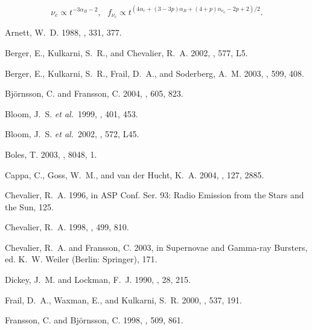 \documentclass[12pt,preprint]{aastex}
\begin{document}
\begin{equation}
\nu_c\propto t^{-3\alpha_B-2},~~~
f_{\nu_c}\propto t^{(4\alpha_r+(3-3p)\alpha_B+(4+p)\alpha_{\nu_a}-2p+2)/2}.
\label{eqn:nu_c_2}
\end{equation}

 
%

\begin{thebibliography}{}

{Arnett}, W.~D. 1988, \apj, 331, 377.

{Berger}, E., {Kulkarni}, S.~R., and {Chevalier}, R.~A. 2002, \apjl, 577, L5.

{Berger}, E., {Kulkarni}, S.~R., {Frail}, D.~A., and {Soderberg}, A.~M. 2003,
  \apj, 599, 408.

{Bj{\" o}rnsson}, C. and {Fransson}, C. 2004, \apj, 605, 823.

{Bloom}, J.~S. {\it et al.}\  1999, \nat, 401, 453.

{Bloom}, J.~S. {\it et al.}\  2002, \apjl, 572, L45.

{Boles}, T. 2003, \iaucirc, 8048, 1.

{Cappa}, C., {Goss}, W.~M., and {van der Hucht}, K.~A. 2004, \aj, 127, 2885.

{Chevalier}, R.~A. 1996, in { ASP Conf. Ser. 93: Radio Emission from the Stars
  and the Sun}, 125.

{Chevalier}, R.~A. 1998, \apj, 499, 810.

{Chevalier}, R.~A. and {Fransson}, C. 2003, in Supernovae and Gamma-ray
  Bursters, ed. K.~W. Weiler (Berlin: Springer), 171.

{Dickey}, J.~M. and {Lockman}, F.~J. 1990, \araa, 28, 215.

{Frail}, D.~A., {Waxman}, E., and {Kulkarni}, S.~R. 2000, \apj, 537, 191.

{Fransson}, C. and {Bj{\" o}rnsson}, C. 1998, \apj, 509, 861.


\end{thebibliography}
\end{document}
